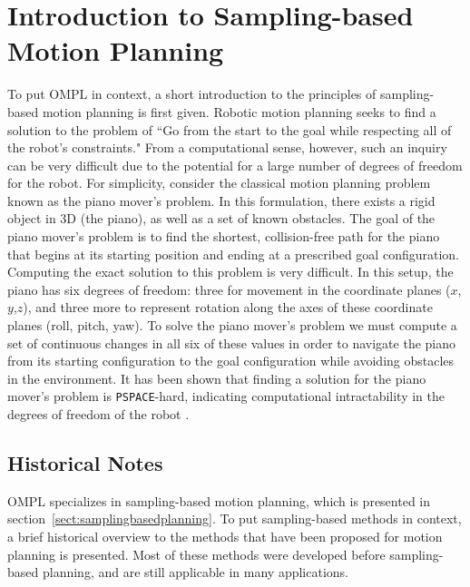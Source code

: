\chapter{Introduction to Sampling-based Motion Planning}
\label{chp:motionplanning}

To put OMPL in context, a short introduction to the principles of
sampling-based motion planning is first given.  Robotic motion planning seeks
to find a solution to the problem of ``Go from the start to the goal while
respecting all of the robot's constraints."  From a computational sense,
however, such an inquiry can be very difficult due to the potential for a large
number of degrees of freedom for the robot.  For simplicity, consider the
classical motion planning problem known as the piano mover's problem.  In this
formulation, there exists a rigid object in 3D (the piano), as well as a set of
known obstacles.  The goal of the piano mover's problem is to find the shortest,
collision-free path for the piano that begins at its starting position and
ending at a prescribed goal configuration.  Computing the exact solution to
this problem is very difficult.  In this setup, the piano has six degrees of
freedom: three for movement in the coordinate planes ($x$,$y$,$z$), and three
more to represent rotation along the axes of these coordinate planes (roll,
pitch, yaw).  To solve the piano mover's problem we must compute a set of
continuous changes in all six of these values in order to navigate the piano
from its starting configuration to the goal configuration while avoiding
obstacles in the environment.  It has been shown that finding a solution for
the piano mover's problem is {\tt PSPACE}-hard, indicating computational
intractability in the degrees of freedom of the robot \cite{Latombe:1991,
Choset:2005, LaValle:2006}.

\section {Historical Notes}
OMPL specializes in sampling-based motion planning, which is presented in
section~\ref {sect:samplingbasedplanning}.  To put sampling-based methods
in context, a brief historical overview to the methods that have been proposed
for motion planning is presented.  Most of these methods were developed before
sampling-based planning, and are still applicable in many applications.

